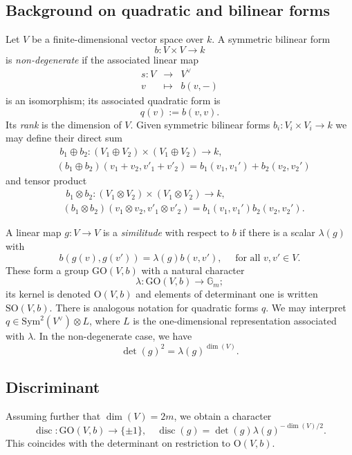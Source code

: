 \documentclass[12pt]{amsart}
\numberwithin{equation}{section}
\newcommand{\ra}{\rightarrow}
\newcommand{\bG}{\mathbb{G}}
\newcommand{\disc}{\operatorname{disc}}
\newcommand{\GO}{\mathrm{GO}}
\newcommand{\OO}{\mathrm{O}}
\newcommand{\SO}{\mathrm{SO}}
\newcommand{\Sym}{\mathrm{Sym}}
\theoremstyle{plain}
\theoremstyle{definition}
\theoremstyle{remark}
\begin{document}
\subsection*{Background on quadratic and bilinear forms}
Let $V$ be a finite-dimensional vector space over $k$. 
A symmetric bilinear form
$$b:V \times V \rightarrow k$$
is {\em non-degenerate} if the associated linear map
$$\begin{array}{rcl}
    s:V& \ra & V^{\vee} \\
    v & \mapsto & b(v,-)
    \end{array}
$$ 
is an isomorphism; its associated quadratic form is 
$$
q(v):=b(v,v).
$$
Its {\em rank} is the dimension of $V$.
Given symmetric bilinear forms $b_i:V_i\times V_i \rightarrow k$
we may define their direct sum
\begin{align*}
&\,\,b_1\oplus b_2: (V_1 \oplus V_2) \times (V_1 \oplus V_2) \rightarrow k,\\
&(b_1\oplus b_2)(v_1+v_2, v'_1+v'_2)=b_1(v_1,v_1') + b_2(v_2,v_2')
\end{align*}
and tensor product
\begin{align*}
 & \,\,   b_1\otimes b_2: (V_1 \otimes V_2) \times (V_1 \otimes V_2) \rightarrow k,
    \\
& (b_1\otimes b_2)(v_1\otimes v_2, v'_1\otimes v'_2)=b_1(v_1,v_1') b_2(v_2,v_2').
\end{align*}



A linear map $g:V \rightarrow V$ is a {\em similitude} with respect to $b$ if
there is a scalar $\lambda(g)$ with
$$b(g(v),g(v'))= \lambda(g) b(v,v'), \quad \text{ for all }v,v' \in V.$$
These form a group $\GO(V,b)$ with a natural character
$$\lambda: \GO(V,b) \rightarrow \bG_m;$$
its kernel is denoted $\OO(V,b)$ and elements of determinant one
is written $\SO(V,b)$. There is analogous
notation for quadratic forms $q$.
We may interpret $q \in \Sym^2(V^{\vee})\otimes L$,
where $L$
is the one-dimensional representation associated with $\lambda$.
In the non-degenerate case, we have \cite[\S 12.A]{KMRT}
$$\det(g)^2 = \lambda(g)^{\dim(V)}.$$

\subsection*{Discriminant}
Assuming further that $\dim(V)=2m$, we obtain a character
$$\disc:\GO(V,b) \ra \{ \pm 1\}, \quad \disc(g)=\det(g) \lambda(g)^{-\dim(V)/2}.$$
This coincides with the determinant on 
restriction to $\OO(V,b)$.  
\end{document}

